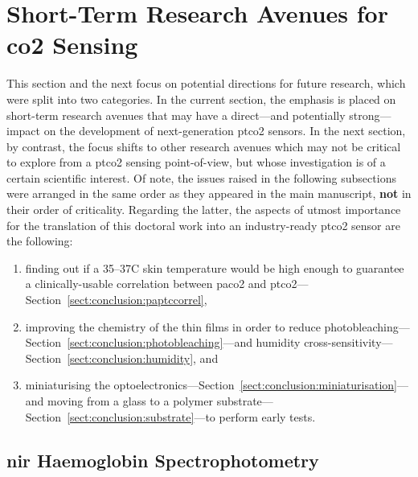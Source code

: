 \section{Short-Term Research Avenues for \texorpdfstring{\gls{co2}}{CO2} Sensing}

This section and the next focus on potential directions for future research, which were split into two categories. In the current section, the emphasis is placed on short-term research avenues that may have a direct---and potentially strong---impact on the development of next-generation \gls{ptco2} sensors. In the next section, by contrast, the focus shifts to other research avenues which may not be critical to explore from a \gls{ptco2} sensing point-of-view, but whose investigation is of a certain scientific interest. Of note, the issues raised in the following subsections were arranged in the same order as they appeared in the main manuscript, \textbf{not} in their order of criticality. Regarding the latter, the aspects of utmost importance for the translation of this doctoral work into an industry-ready \gls{ptco2} sensor are the following:
\begin{enumerate}
	\item finding out if a 35--37{\degree}C skin temperature would be high enough to guarantee a clinically-usable correlation between \gls{paco2} and \gls{ptco2}---Section~\ref{sect:conclusion:paptccorrel},
	\item improving the chemistry of the thin films in order to reduce photobleaching---Section~\ref{sect:conclusion:photobleaching}---and humidity cross-sensitivity---Section~\ref{sect:conclusion:humidity}, and
	\item miniaturising the optoelectronics---Section~\ref{sect:conclusion:miniaturisation}---and moving from a glass to a polymer substrate---Section~\ref{sect:conclusion:substrate}---to perform early \invivo{} tests.
\end{enumerate}

\subsection{\texorpdfstring{\gls{nir}}{NIR} Haemoglobin Spectrophotometry}

